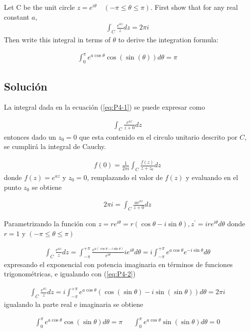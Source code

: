 \begin{problem}{4}
    Let C be the unit circle $z = e^{i\theta} \quad (-\pi \leq \theta \leq \pi)$. First show that for any real constant $a$,
    \begin{gather}
        \label{eq:P4-1}\int_C \frac{e^{az}}{z}dz = 2\pi i
    \end{gather}
    Then write this integral in terms of $\theta$ to derive the integration formula:

    \begin{gather}
        \int_{0}^{\pi} e^{a\cos\theta}\cos(\sin(\theta))d\theta = \pi
    \end{gather}
\end{problem}
\subsection*{Solución}

La integral dada en la ecuación (\ref*{eq:P4-1}) se puede expresar como 

\begin{gather*}
    \int_C \frac{e^{az}}{z+0}dz 
\end{gather*}
entonces dado un $z_0 = 0$ que esta contenido en el circulo unitario descrito por $C$, se cumplirá la integral de Cauchy.

\begin{gather*}
    f(0) = \frac{1}{2\pi i}\int_{C} \frac{f(z)}{z+z_0}dz 
\end{gather*}
donde $f(z) = e^{az}$ y $z_0 = 0$, remplazando el valor de $f(z)$ y  evaluando en el punto $z_0$ se obtiene 

\begin{result}
    \begin{gather}
        \label{eq:P4-2}2\pi i = \int_{C} \frac{ae^{az}}{z+0}dz 
    \end{gather}
\end{result}
Parametrizando la función con $z =re^{i\theta} = r(\cos\theta - i\sin\theta), z^{\prime} = ire^{i\theta}d\theta $ donde $r = 1$ y $(-\pi \leq \theta \leq \pi)$

\begin{gather*}
    \int_C \frac{e^{az}}{z}dz = \int_{-\pi}^{+\pi} \frac{e^{a(\cos\theta - i\sin\theta)}}{e^{i\theta}}ie^{i\theta}d\theta = i\int_{-\pi}^{+\pi} e^{a\cos\theta}e^{-i\sin\theta}d\theta
\end{gather*}
expresando el exponencial con potencia imaginaria en términos de funciones trigonométricas, e igualando con (\ref*{eq:P4-2})

\begin{gather*}
    \int_C \frac{e^{az}}{z}dz = i\int_{-\pi}^{+\pi} e^{a\cos\theta}(\cos(\sin\theta) - i\sin(\sin\theta)) d\theta = 2\pi i
\end{gather*}
igualando la parte real e imaginaria se obtiene 

\begin{result}
    \begin{align}
        \int_{0}^{\pi} e^{a\cos\theta}\cos(\sin\theta)d\theta = \pi  &&  \int_{0}^{\pi} e^{a\cos\theta}\sin(\sin\theta)d\theta  = 0
    \end{align}
\end{result}